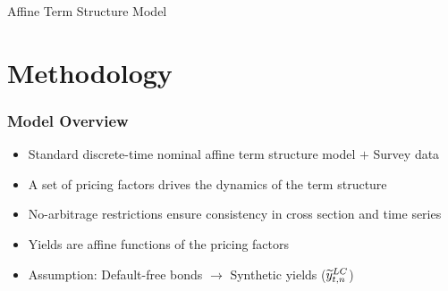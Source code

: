 \documentclass[12pt, aspectratio=169, xcolor=dvipsnames]{beamer}  %
\begin{document}
\begin{frame}
\begin{center}
	\huge \textcolor{yaleblue}{Affine Term Structure Model}
\end{center}
\end{frame}

\section{Methodology}

\begin{frame}[label=ATSM]
	\frametitle{Model Overview}
	\begin{itemize}
		\item Standard discrete-time nominal affine term structure model \(+\) Survey data
		\item A set of pricing factors drives the dynamics of the term structure
		\item No-arbitrage restrictions ensure consistency in cross section and time series %
		\item Yields are affine functions of the pricing factors
		\item Assumption: Default-free bonds \(\rightarrow\) Synthetic yields (\(\widetilde{y}_{t,n} ^{LC}\))
	\end{itemize}
\end{frame}
\end{document}
